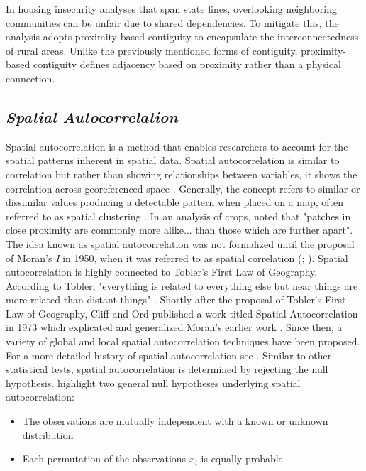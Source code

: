 In housing insecurity analyses that span state lines, overlooking neighboring communities can be unfair due to shared dependencies. To mitigate this, the analysis adopts proximity-based contiguity to encapsulate the interconnectedness of rural areas. Unlike the previously mentioned forms of contiguity, proximity-based contiguity defines adjacency based on proximity rather than a physical connection.  

\subsection{\textit{Spatial Autocorrelation}} 

Spatial autocorrelation is a method that enables researchers to account for the spatial patterns inherent in spatial data. Spatial autocorrelation is similar to correlation but rather than showing relationships between variables, it shows the correlation across georeferenced space \citep{getis_history_2008}. Generally, the concept refers to similar or dissimilar values producing a detectable pattern when placed on a map, often referred to as spatial clustering \citep{griffith_what_1992}. In an analysis of crops, \citet[74]{fisher_design_1935} noted that "patches in close proximity are commonly more alike... than those which are further apart". The idea known as spatial autocorrelation was not formalized until the proposal of Moran's \textit{I} in 1950, when it was referred to as spatial correlation (\citealp{moran_notes_1950}; \citealp{getis_history_2008}). Spatial autocorrelation is highly connected to Tobler's First Law of Geography. According to Tobler, "everything is related to everything else but near things are more related than distant things" \citep[236]{tobler_computer_1970}. Shortly after the proposal of Tobler's First Law of Geography, Cliff and Ord published a work titled Spatial Autocorrelation in 1973 which explicated and generalized Moran's earlier work \citep{getis_history_2008}. Since then, a variety of global and local spatial autocorrelation techniques have been proposed. For a more detailed history of spatial autocorrelation see \citet{fischer_spatial_2010}. Similar to other statistical tests, spatial autocorrelation is determined by rejecting the null hypothesis. \citet{de_jong_extreme_1984} highlight two general null hypotheses underlying spatial autocorrelation: 

\begin{itemize} 

\item The observations are mutually independent with a known or unknown distribution  

\item Each permutation of the observations $x_i$ is equally probable  

\end{itemize} 

